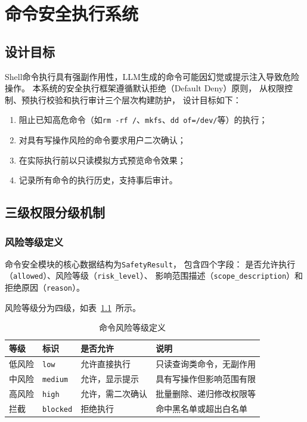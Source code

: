 \chapter{命令安全执行系统}
\label{chap:safety}

\section{设计目标}

Shell命令执行具有强副作用性，LLM生成的命令可能因幻觉或提示注入导致危险操作。
本系统的安全执行框架遵循默认拒绝（Default Deny）原则，
从权限控制、预执行校验和执行审计三个层次构建防护，
设计目标如下：

\begin{enumerate}
    \item 阻止已知高危命令（如\texttt{rm -rf /}、\texttt{mkfs}、\texttt{dd of=/dev/}等）的执行；
    \item 对具有写操作风险的命令要求用户二次确认；
    \item 在实际执行前以只读模拟方式预览命令效果；
    \item 记录所有命令的执行历史，支持事后审计。
\end{enumerate}

\section{三级权限分级机制}

\subsection{风险等级定义}

命令安全模块的核心数据结构为\texttt{SafetyResult}，
包含四个字段：
是否允许执行（\texttt{allowed}）、风险等级（\texttt{risk\_level}）、
影响范围描述（\texttt{scope\_description}）和拒绝原因（\texttt{reason}）。

风险等级分为四级，如表~\ref{tab:risk-levels}~所示。

\begin{table}[htbp]
\centering
\caption{命令风险等级定义}
\label{tab:risk-levels}
\begin{tabular}{lllp{5cm}}
\toprule
等级 & 标识 & 是否允许 & 说明 \\
\midrule
低风险 & \texttt{low} & 允许直接执行 & 只读查询类命令，无副作用 \\
中风险 & \texttt{medium} & 允许，显示提示 & 具有写操作但影响范围有限 \\
高风险 & \texttt{high} & 允许，需二次确认 & 批量删除、递归修改权限等 \\
拦截 & \texttt{blocked} & 拒绝执行 & 命中黑名单或超出白名单 \\
\bottomrule
\end{tabular}
\end{table}

